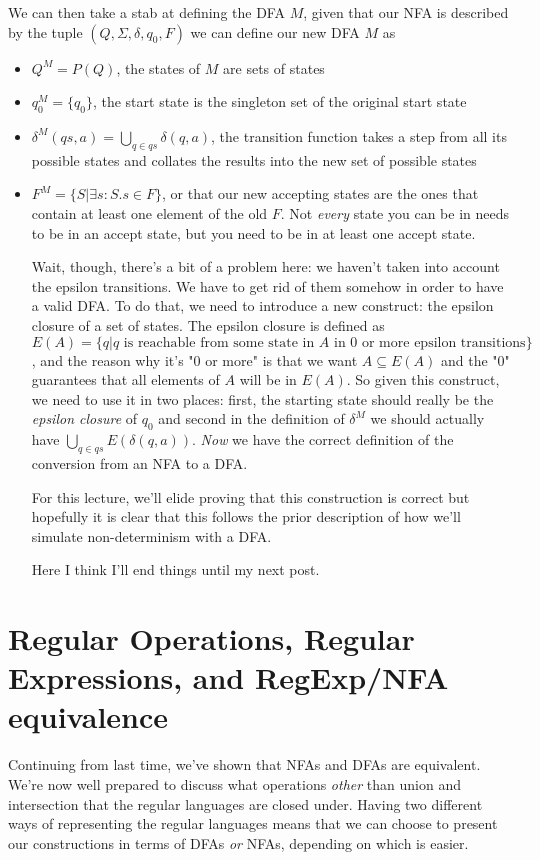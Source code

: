 \documentclass[11pt]{article}
\begin{document}
We can then take a stab at defining the DFA $M$, given that our NFA is described by the tuple $(Q,\Sigma,\delta,q_0,F)$ we can define  our new DFA $M$ as 

\begin{itemize}
\item $Q^M = P(Q)$, the states of $M$ are sets of states
\item $q^M_0 = \{ q_0 \}$, the start state is the singleton set of the original start state
\item $\delta^M(qs,a) = \bigcup_{q \in qs} \delta(q,a)$, the transition function takes a step from all its possible states and collates the results into the new set of possible states
\item $F^M = \{S | \exists s : S. s \in F\}$, or that our new accepting states are the ones that contain at least one element of the old $F$. Not \emph{every} state you can be in needs to be in an accept state, but you need to be in at least one accept state.

Wait, though, there's a bit of a problem here: we haven't taken into account the epsilon transitions. We have to get rid of them somehow in order to have a valid DFA. To do that, we need to introduce a new construct: the epsilon closure of a set of states. The epsilon closure is defined as $E(A) = \{q | q \text{ is reachable from some state in } A \text{ in 0 or more epsilon transitions}\}$, and the reason why it's "0 or more" is that we want $A \subseteq E(A)$ and the "0" guarantees that all elements of $A$ will be in $E(A)$. So given this construct, we need to use it in two places: first, the starting state should really be the \emph{epsilon closure} of $q_0$ and second in the definition of $\delta^M$ we should actually have $\bigcup_{q \in qs} E(\delta(q,a))$. \emph{Now} we have the correct definition of the conversion from an NFA to a DFA. 

For this lecture, we'll elide proving that this construction is correct but hopefully it is clear that this follows the prior description of how we'll simulate non-determinism with a DFA. 

Here I think I'll end things until my next post.
\end{itemize}
\section{Regular Operations, Regular Expressions, and RegExp/NFA equivalence}
\label{sec-4}
Continuing from last time, we've shown that NFAs and DFAs are equivalent. We're now well prepared to discuss what operations \emph{other} than union and intersection that the regular languages are closed under. Having two different ways of representing the regular languages means that we can choose to present our constructions in terms of DFAs \emph{or} NFAs, depending on which is easier. 
\end{document}
